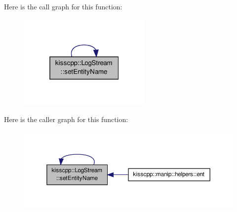 Here is the call graph for this function\-:
\nopagebreak
\begin{figure}[H]
\begin{center}
\leavevmode
\includegraphics[width=184pt]{classkisscpp_1_1_log_stream_adaf27d5069674b2e934883c107187686_cgraph}
\end{center}
\end{figure}




Here is the caller graph for this function\-:
\nopagebreak
\begin{figure}[H]
\begin{center}
\leavevmode
\includegraphics[width=350pt]{classkisscpp_1_1_log_stream_adaf27d5069674b2e934883c107187686_icgraph}
\end{center}
\end{figure}


